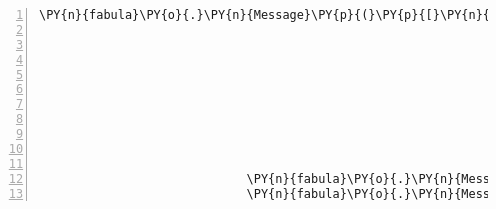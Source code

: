 \begin{Verbatim}[commandchars=\\\{\},numbers=left,firstnumber=1,stepnumber=1]
                             \PY{n}{fabula}\PY{o}{.}\PY{n}{Message}\PY{p}{(}\PY{p}{[}\PY{n}{fabula}\PY{o}{.}\PY{n}{SpawnEvent}\PY{p}{(}\PY{n}{fabula}\PY{o}{.}\PY{n}{Entity}\PY{p}{(}\PY{l+s}{\PYZsq{}}\PY{l+s}{lute}\PY{l+s}{\PYZsq{}}\PY{p}{,}
                                                                             \PY{n}{fabula}\PY{o}{.}\PY{n}{ITEM}\PY{p}{,}
                                                                             \PY{n+nb+bp}{True}\PY{p}{,}
                                                                             \PY{n+nb+bp}{True}\PY{p}{,}
                                                                             \PY{p}{\PYZob{}}\PY{l+s}{\PYZsq{}}\PY{l+s}{image/png}\PY{l+s}{\PYZsq{}}\PY{p}{:} \PY{n}{fabula}\PY{o}{.}\PY{n}{Asset}\PY{p}{(}\PY{n}{uri}\PY{o}{=}\PY{l+s}{\PYZsq{}}\PY{l+s}{lute.png}\PY{l+s}{\PYZsq{}}\PY{p}{,}
                                                                                                        \PY{n}{data}\PY{o}{=}\PY{n+nb+bp}{None}\PY{p}{)}\PY{p}{,}
                                                                              \PY{l+s}{\PYZsq{}}\PY{l+s}{audio/ogg}\PY{l+s}{\PYZsq{}}\PY{p}{:} \PY{n}{fabula}\PY{o}{.}\PY{n}{Asset}\PY{p}{(}\PY{n}{uri}\PY{o}{=}\PY{l+s}{\PYZsq{}}\PY{l+s}{lute.ogg}\PY{l+s}{\PYZsq{}}\PY{p}{,}
                                                                                                        \PY{n}{data}\PY{o}{=}\PY{n+nb+bp}{None}\PY{p}{)}\PY{p}{,}
                                                                              \PY{l+s}{\PYZsq{}}\PY{l+s}{text/plain}\PY{l+s}{\PYZsq{}}\PY{p}{:} \PY{n}{fabula}\PY{o}{.}\PY{n}{Asset}\PY{p}{(}\PY{n}{uri}\PY{o}{=}\PY{l+s}{\PYZsq{}}\PY{l+s}{lute.txt}\PY{l+s}{\PYZsq{}}\PY{p}{,}
                                                                                                         \PY{n}{data}\PY{o}{=}\PY{n+nb+bp}{None}\PY{p}{)}\PY{p}{\PYZcb{}}\PY{p}{)}\PY{p}{,}
                                                               \PY{n}{room}\PY{o}{.}\PY{n}{entity\PYZus{}locations}\PY{p}{[}\PY{n}{ID\PYZus{}CASSANDRA}\PY{p}{]} \PY{o}{+} \PY{p}{(}\PY{n}{room}\PY{o}{.}\PY{n}{identifier}\PY{p}{,}\PY{p}{)}\PY{p}{)}\PY{p}{]}\PY{p}{)}\PY{p}{,}
                             \PY{n}{fabula}\PY{o}{.}\PY{n}{Message}\PY{p}{(}\PY{p}{[}\PY{n}{fabula}\PY{o}{.}\PY{n}{DeleteEvent}\PY{p}{(}\PY{n}{identifier}\PY{o}{=}\PY{l+s}{\PYZsq{}}\PY{l+s}{lute\PYZus{}broken}\PY{l+s}{\PYZsq{}}\PY{p}{)}\PY{p}{]}\PY{p}{)}\PY{p}{,}
                             \PY{n}{fabula}\PY{o}{.}\PY{n}{Message}\PY{p}{(}\PY{p}{[}\PY{n}{fabula}\PY{o}{.}\PY{n}{SaysEvent}\PY{p}{(}\PY{n}{identifier}\PY{o}{=}\PY{n}{ID\PYZus{}CASSANDRA}\PY{p}{,}

\end{Verbatim}
